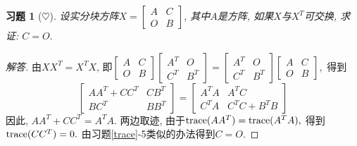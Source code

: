 \documentclass[UTF8]{ctexart}
\newtheorem{ex}[thm]{习题}
\begin{document}
\begin{ex}[$\heartsuit $]
设实分块方阵$X= \begin{bmatrix} A & C \\ O & B  \end{bmatrix} $, 其中$A$是方阵, 如果$X$与$X^T$可交换, 求证: $C = O.$
\end{ex}
\begin{proof}[解答]
由$XX^T = X^T X$, 即$\begin{bmatrix} A & C \\ O & B  \end{bmatrix} \begin{bmatrix} A^T & O \\ C^T & B^T  \end{bmatrix}  = \begin{bmatrix} A^T & O \\ C^T & B^T  \end{bmatrix}  \begin{bmatrix} A & C \\ O & B  \end{bmatrix} ,$ 得到
\[
\begin{bmatrix} AA^T + CC^T & CB^T \\ BC^T & BB^T  \end{bmatrix}  = \begin{bmatrix} A^TA & A^T C \\ C^TA & C^T C + B^T B  \end{bmatrix}
\]
因此, $AA^T + CC^T = A^T A.$ 两边取迹, 由于${\rm trace}(AA^T) ={\rm trace}( A^T A),$ 得到${\rm trace}(CC^T) = 0.$ 由习题\ref{trace}-5类似的办法得到$C=O.$
\end{proof}
\end{document}
